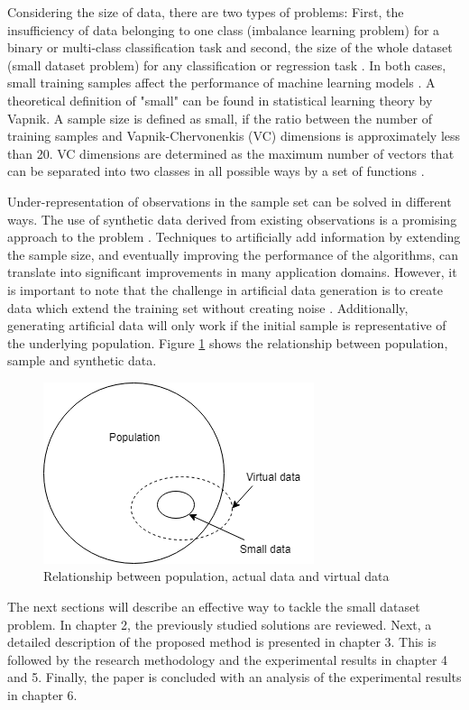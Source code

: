 \documentclass[parskip=full]{scrartcl}
\begin{document}
Considering the size of data, there are two types of problems: First, the
insufficiency of data belonging to one class (imbalance learning problem) for a
binary or multi-class classification task and second, the size of the whole
dataset (small dataset problem) for any classification or regression task
\cite{Sezer.2014}. In both cases, small training samples affect the performance
of machine learning models \cite{Tsai.2008}. A theoretical definition of "small"
can be found in statistical learning theory by Vapnik. A sample size is defined
as small, if the ratio between the number of training samples and
Vapnik-Chervonenkis (VC) dimensions is approximately less than 20. VC dimensions
are determined as the maximum number of vectors that can be separated into two
classes in all possible ways by a set of functions \cite{Vapnik.2008}.

Under-representation of observations in the sample set can be solved in
different ways. The use of synthetic data derived from existing observations is
a promising approach to the problem \cite{Sezer.2014}. Techniques to
artificially add information by extending the sample size, and eventually
improving the performance of the algorithms, can translate into significant
improvements in many application domains. However, it is important to note that
the challenge in artificial data generation is to create data which extend the
training set without creating noise \cite{Li.2006}. Additionally, generating
artificial data will only work if the initial sample is representative of the
underlying population. Figure \ref{fig:relationship} shows the relationship
between population, sample and synthetic data.

\begin{figure}[H]
	\centering
	\includegraphics[width=0.35\linewidth]{../analysis/relationship.png}
	\caption{Relationship between population, actual data and virtual data \cite{Li.2006}}
	\label{fig:relationship}
\end{figure}

The next sections will describe an effective way to tackle the small dataset
problem. In chapter 2, the previously studied solutions are reviewed. Next, a
detailed description of the proposed method is presented in chapter 3. This is
followed by the research methodology and the experimental results in chapter 4
and 5. Finally, the paper is concluded with an analysis of the experimental
results in chapter 6.
\end{document}
